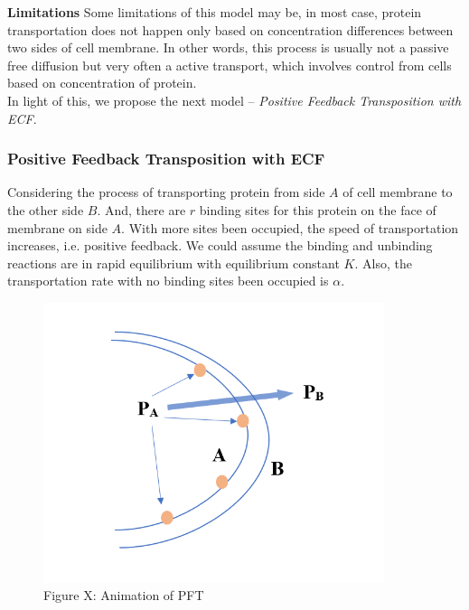 \documentclass[12pt]{article}
\renewcommand{\(}{\left (}
\renewcommand{\)}{\right )}
\begin{document}
\textbf{Limitations}
Some limitations of this model may be, in most case, protein transportation does not happen only based on concentration differences between two sides of cell membrane. In other words, this process is usually not a passive free diffusion but very often a active transport, which involves control from cells based on concentration of protein. \\

In light of this, we propose the next model -- \textit{Positive Feedback Transposition with ECF}.

\subsubsection{Positive Feedback Transposition with ECF}
\hspace{5mm} Considering the process of transporting protein from side $A$ of cell membrane to the other side $B$. And, there are $r$ binding sites for this protein on the face of membrane on side $A$. With more sites been occupied, the speed of transportation increases, i.e. positive feedback. We could assume the binding and unbinding reactions are in rapid equilibrium with equilibrium constant $K$. Also, the transportation rate with no binding sites been occupied is $\alpha$.

\begin{figure} [h]
    \centering
	\begin{minipage}{0.45\textwidth}
		\centering
		\includegraphics[width=0.89\textwidth]{PFAn.png}
		\caption*{\small Figure X: Animation of PFT}
	\end{minipage}

\end{figure}
\end{document}
